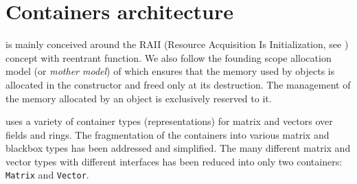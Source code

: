 \section{Containers architecture}\label{sec:container}
%
\linbox is mainly conceived around the RAII (Resource Acquisition Is
Initialization, see \cite{stroustrup1994design}) concept with reentrant
function. We also follow the {founding scope allocation} model (or \emph{mother
model}) of \cite{Dumas:2010:lbpar} which ensures that the memory used by
objects is allocated in the constructor and freed only at its destruction. The
management of the memory allocated by an object is exclusively reserved to it.
%
\par
%
\linbox uses a variety of container types (representations) for matrix and vectors over fields and rings.
The fragmentation of the containers into various matrix and
blackbox types has been addressed and simplified. The many different matrix and
vector types with different interfaces has been reduced into only two
containers: \texttt{Matrix} and
\texttt{Vector}.
%

